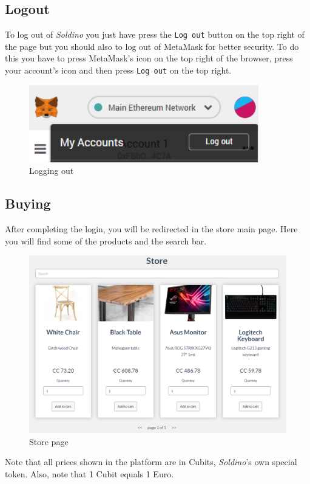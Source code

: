 	\subsection{Logout}
	To log out of \textit{Soldino} you just have press the \texttt{Log out} button on 
	the top right of the page but you should also to log out of MetaMask\glosp{} 
	for better security. To do this you have to press MetaMask's icon on the top 
	right of the browser, press your account's icon and then press \texttt{Log out}
	on the top right.
	\begin{figure}[H]
		\includegraphics[width=10cm]{res/images/logout_metamask.png}
		\centering
		\caption{Logging out}
	\end{figure}
	\subsection{Buying}
	After completing the login, you will be redirected in the store main page. 
	Here you will find some of the products and the search bar.
	\begin{figure}[H]
		\includegraphics[width=15cm]{res/images/store_main_page.png}
		\centering
		\caption{Store page}
	\end{figure}
	\noindent Note that all prices shown in the platform are in Cubits\glo{}, 
	\textit{Soldino}'s own special token. Also, note that 1 Cubit equals 1 Euro.
